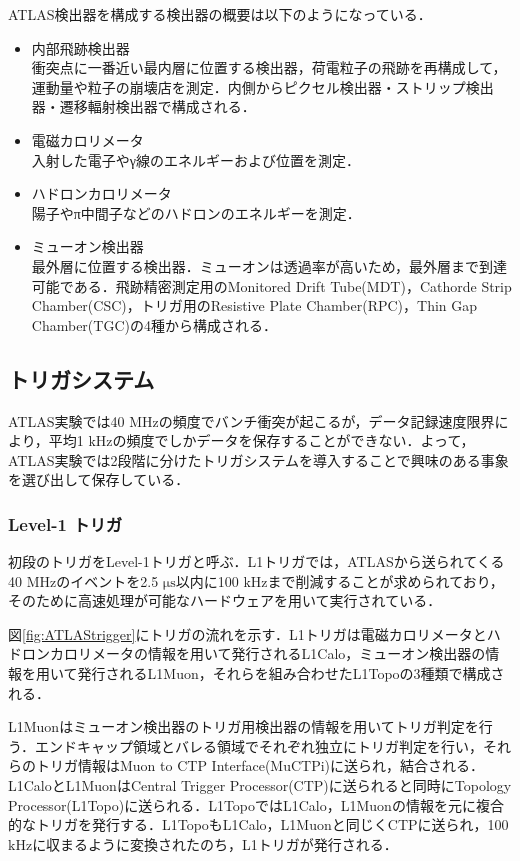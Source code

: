 ATLAS検出器を構成する検出器の概要は以下のようになっている．\par
\begin{itemize}
\item 内部飛跡検出器\\
衝突点に一番近い最内層に位置する検出器，荷電粒子の飛跡を再構成して，運動量や粒子の崩壊店を測定．内側からピクセル検出器・ストリップ検出器・遷移輻射検出器で構成される．
\item 電磁カロリメータ\\
入射した電子やγ線のエネルギーおよび位置を測定．
\item ハドロンカロリメータ\\
陽子やπ中間子などのハドロンのエネルギーを測定．
\item ミューオン検出器\\
最外層に位置する検出器．ミューオンは透過率が高いため，最外層まで到達可能である．飛跡精密測定用のMonitored Drift Tube(MDT)，Cathorde Strip Chamber(CSC)，トリガ用のResistive Plate Chamber(RPC)，Thin Gap Chamber(TGC)の4種から構成される．
\end{itemize}


\subsection{トリガシステム}
ATLAS実験では40 $\mathrm{MHz}$の頻度でバンチ衝突が起こるが，データ記録速度限界により，平均1 $\mathrm{kHz}$の頻度でしかデータを保存することができない．よって，ATLAS実験では2段階に分けたトリガシステムを導入することで興味のある事象を選び出して保存している．

\subsubsection*{Level-1 トリガ}
初段のトリガをLevel-1トリガと呼ぶ．L1トリガでは，ATLASから送られてくる40 $\mathrm{MHz}$のイベントを2.5 $\mathrm{\mu s}$以内に100 $\mathrm{kHz}$まで削減することが求められており，そのために高速処理が可能なハードウェアを用いて実行されている．\par
図\ref{fig:ATLAStrigger}にトリガの流れを示す．L1トリガは電磁カロリメータとハドロンカロリメータの情報を用いて発行されるL1Calo，ミューオン検出器の情報を用いて発行されるL1Muon，それらを組み合わせたL1Topoの3種類で構成される．\par
L1Muonはミューオン検出器のトリガ用検出器の情報を用いてトリガ判定を行う．エンドキャップ領域とバレる領域でそれぞれ独立にトリガ判定を行い，それらのトリガ情報はMuon to CTP Interface(MuCTPi)に送られ，結合される．L1CaloとL1MuonはCentral Trigger Processor(CTP)に送られると同時にTopology Processor(L1Topo)に送られる．L1TopoではL1Calo，L1Muonの情報を元に複合的なトリガを発行する．L1TopoもL1Calo，L1Muonと同じくCTPに送られ，100 $\mathrm{kHz}$に収まるように変換されたのち，L1トリガが発行される．

